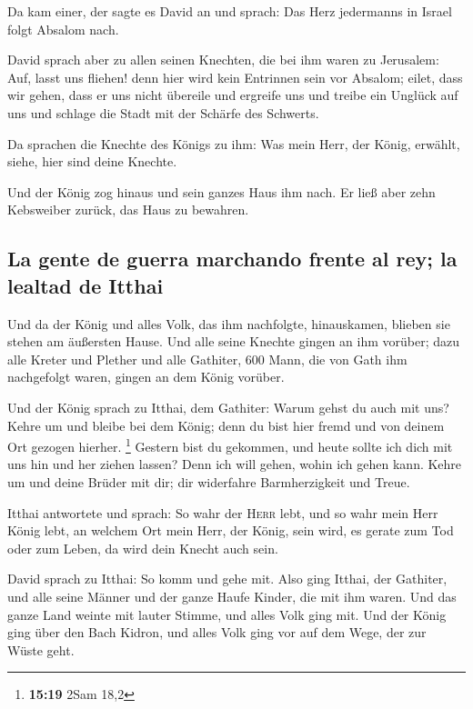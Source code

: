  Da kam einer, der sagte es David an und sprach: Das Herz
jedermanns in Israel folgt Absalom nach.

 David sprach aber zu allen seinen Knechten, die bei ihm
waren zu Jerusalem: Auf, lasst uns fliehen! denn hier wird kein
Entrinnen sein vor Absalom; eilet, dass wir gehen, dass er uns nicht
übereile und ergreife uns und treibe ein Unglück auf uns und schlage die
Stadt mit der Schärfe des Schwerts.

 Da sprachen die Knechte des Königs zu ihm: Was mein
Herr, der König, erwählt, siehe, hier sind deine Knechte.

 Und der König zog hinaus und sein ganzes Haus ihm nach.
Er ließ aber zehn Kebsweiber zurück, das Haus zu bewahren.

\hypertarget{la-gente-de-guerra-marchando-frente-al-rey-la-lealtad-de-itthai}{%
\subsection{La gente de guerra marchando frente al rey; la lealtad de
Itthai}\label{la-gente-de-guerra-marchando-frente-al-rey-la-lealtad-de-itthai}}

 Und da der König und alles Volk, das ihm nachfolgte,
hinauskamen, blieben sie stehen am äußersten Hause.  Und
alle seine Knechte gingen an ihm vorüber; dazu alle Kreter und Plether
und alle Gathiter, 600 Mann, die von Gath ihm nachgefolgt waren, gingen
an dem König vorüber.

 Und der König sprach zu Itthai, dem Gathiter: Warum
gehst du auch mit uns? Kehre um und bleibe bei dem König; denn du bist
hier fremd und von deinem Ort gezogen hierher. \footnote{\textbf{15:19}
  2Sam 18,2}  Gestern bist du gekommen, und heute sollte
ich dich mit uns hin und her ziehen lassen? Denn ich will gehen, wohin
ich gehen kann. Kehre um und deine Brüder mit dir; dir widerfahre
Barmherzigkeit und Treue.

 Itthai antwortete und sprach: So wahr der \textsc{Herr}
lebt, und so wahr mein Herr König lebt, an welchem Ort mein Herr, der
König, sein wird, es gerate zum Tod oder zum Leben, da wird dein Knecht
auch sein.

 David sprach zu Itthai: So komm und gehe mit. Also ging
Itthai, der Gathiter, und alle seine Männer und der ganze Haufe Kinder,
die mit ihm waren.  Und das ganze Land weinte mit lauter
Stimme, und alles Volk ging mit. Und der König ging über den Bach
Kidron, und alles Volk ging vor auf dem Wege, der zur Wüste geht.

